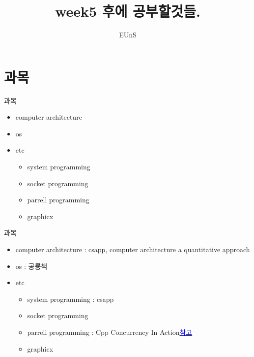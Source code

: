 \documentclass[10pt]{beamer}
\title{week5 후에 공부할것들.}
\author{EUnS}
\begin{document}
\begin{frame}
    \maketitle
\end{frame}  

\begin{frame}
    \tableofcontents
\end{frame}    

\section{과목}

\begin{frame}{과목}
    \begin{itemize}
        \item computer architecture
        \item os
        \item etc
        \begin{itemize}
            \item system programming
            \item socket programming
            \item parrell programming
            \item graphicx
        \end{itemize}
    \end{itemize}
\end{frame}

\begin{frame}{과목}
    \begin{itemize}
        \item computer architecture : csapp, computer architecture a quantitative approach
        \item os : 공룡책
        \item etc
        \begin{itemize}
            \item system programming : csapp
            \item socket programming 
            \item parrell programming : Cpp Concurrency In Action\href{https://github.com/CppKorea/CppConcurrencyInAction}{\textcolor{blue}{참고}}
            \item graphicx
        \end{itemize}
    \end{itemize}
\end{frame}
\end{document}
